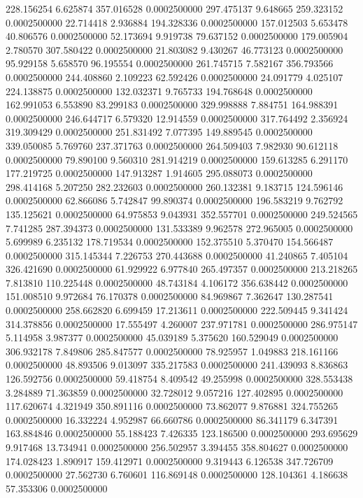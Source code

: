 228.156254 6.625874 357.016528 0.0002500000
297.475137 9.648665 259.323152 0.0002500000
22.714418 2.936884 194.328336 0.0002500000
157.012503 5.653478 40.806576 0.0002500000
52.173694 9.919738 79.637152 0.0002500000
179.005904 2.780570 307.580422 0.0002500000
21.803082 9.430267 46.773123 0.0002500000
95.929158 5.658570 96.195554 0.0002500000
261.745715 7.582167 356.793566 0.0002500000
244.408860 2.109223 62.592426 0.0002500000
24.091779 4.025107 224.138875 0.0002500000
132.032371 9.765733 194.768648 0.0002500000
162.991053 6.553890 83.299183 0.0002500000
329.998888 7.884751 164.988391 0.0002500000
246.644717 6.579320 12.914559 0.0002500000
317.764492 2.356924 319.309429 0.0002500000
251.831492 7.077395 149.889545 0.0002500000
339.050085 5.769760 237.371763 0.0002500000
264.509403 7.982930 90.612118 0.0002500000
79.890100 9.560310 281.914219 0.0002500000
159.613285 6.291170 177.219725 0.0002500000
147.913287 1.914605 295.088073 0.0002500000
298.414168 5.207250 282.232603 0.0002500000
260.132381 9.183715 124.596146 0.0002500000
62.866086 5.742847 99.890374 0.0002500000
196.583219 9.762792 135.125621 0.0002500000
64.975853 9.043931 352.557701 0.0002500000
249.524565 7.741285 287.394373 0.0002500000
131.533389 9.962578 272.965005 0.0002500000
5.699989 6.235132 178.719534 0.0002500000
152.375510 5.370470 154.566487 0.0002500000
315.145344 7.226753 270.443688 0.0002500000
41.240865 7.405104 326.421690 0.0002500000
61.929922 6.977840 265.497357 0.0002500000
213.218265 7.813810 110.225448 0.0002500000
48.743184 4.106172 356.638442 0.0002500000
151.008510 9.972684 76.170378 0.0002500000
84.969867 7.362647 130.287541 0.0002500000
258.662820 6.699459 17.213611 0.0002500000
222.509445 9.341424 314.378856 0.0002500000
17.555497 4.260007 237.971781 0.0002500000
286.975147 5.114958 3.987377 0.0002500000
45.039189 5.375620 160.529049 0.0002500000
306.932178 7.849806 285.847577 0.0002500000
78.925957 1.049883 218.161166 0.0002500000
48.893506 9.013097 335.217583 0.0002500000
241.439093 8.836863 126.592756 0.0002500000
59.418754 8.409542 49.255998 0.0002500000
328.553438 3.284889 71.363859 0.0002500000
32.728012 9.057216 127.402895 0.0002500000
117.620674 4.321949 350.891116 0.0002500000
73.862077 9.876881 324.755265 0.0002500000
16.332224 4.952987 66.660786 0.0002500000
86.341179 6.347391 163.884846 0.0002500000
55.188423 7.426335 123.186500 0.0002500000
293.695629 9.917468 13.734941 0.0002500000
256.502957 3.394455 358.804627 0.0002500000
174.028423 1.890917 159.412971 0.0002500000
9.319443 6.126538 347.726709 0.0002500000
27.562730 6.760601 116.869148 0.0002500000
128.104361 4.186638 57.353306 0.0002500000
